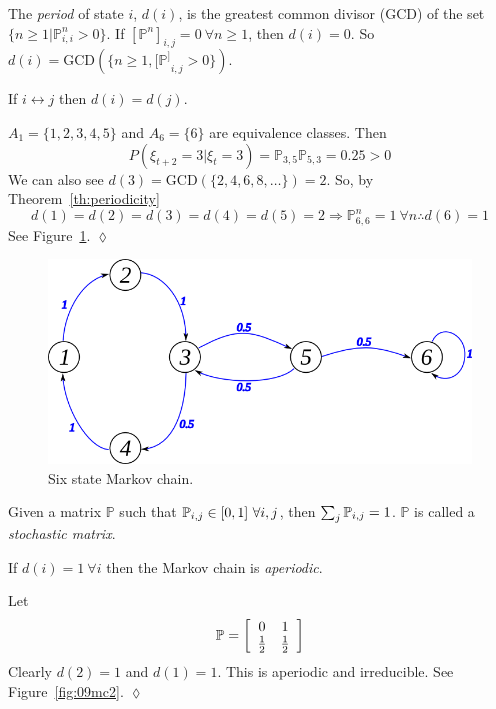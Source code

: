\begin{definition}
The \textit{period} of state $i$, $d(i)$, is the greatest common divisor (GCD) of the set $\{n\geq1|\mathbb{P}_{i,i}^n>0\}$.
If ${[\mathbb{P}^n]}_{i,j} = 0~\forall n\geq1$, then $d(i)=0$.
So $d(i) = \text{GCD}(\{n\geq1,{[\mathbb{P}^]}_{i,j}>0\})$.
\end{definition}

\begin{theorem}
\label{th:periodicity}
If $i\leftrightarrow j$ then $d(i)=d(j)$.
\end{theorem}

\begin{example}
$A_1=\{1,2,3,4,5\}$ and $A_6=\{6\}$ are equivalence classes.
Then
$$P(\xi_{t+2}=3|\xi_t=3) = \mathbb{P}_{3,5}\mathbb{P}_{5,3} = 0.25> 0$$
We can also see $d(3)=\text{GCD}(\{2,4,6,8,\ldots\})=2$.
So, by Theorem~\ref{th:periodicity}
$$d(1)=d(2)=d(3)=d(4)=d(5)=2 \Rightarrow \mathbb{P}_{6,6}^n=1~\forall n \therefore d(6)=1$$
See Figure~\ref{fig:09mc6}.
$\lozenge$
\end{example}

\begin{figure}[ht!]
\centering
\includegraphics[width=.4\textwidth]{images/09mc6}
\caption{Six state Markov chain.}
\label{fig:09mc6}
\end{figure}

\begin{definition}
Given a matrix $\mathbb{P}$ such that $\mathbb{P}_{i,j}\in[0,1]~\forall i,j$, then $\sum_j\mathbb{P}_{i,j}=1$.
$\mathbb{P}$ is called a \textit{stochastic matrix}.
\end{definition}

\begin{definition}
If $d(i)=1~\forall i$ then the Markov chain is \textit{aperiodic}.
\end{definition}

\begin{example}
Let
$$\mathbb{P} = \left[\begin{array}{c c} 0 & 1 \\ \frac{1}{2} & \frac{1}{2} \end{array}\right]$$
Clearly $d (2)=1$ and $d (1)=1$.
This is aperiodic and irreducible.
See Figure~\ref{fig:09mc2}.
$\lozenge$
\end{example}

